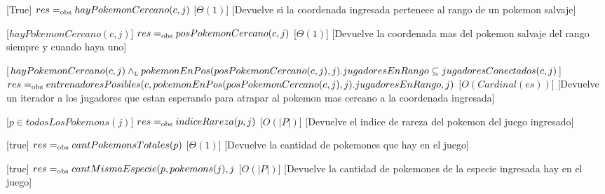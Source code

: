\begin{Interfaz}
  [True]
  {$res =_{\mathrm{obs}} hayPokemonCercano(c,j)$}
  [$\Theta(1)$] 
  [Devuelve si la coordenada ingresada pertenece al rango de un pokemon salvaje]   

  [$hayPokemonCercano(c,j)$]
  {$res =_{\mathrm{obs}} posPokemonCercano(c,j)$}
  [$\Theta(1)$] %
  [Devuelve la coordenada mas del pokemon salvaje del rango siempre y cuando haya uno]   

  [$hayPokemonCercano(c,j) \land_{\mathrm{\scriptscriptstyle{L}}} pokemonEnPos(posPokemonCercano(c,j),j).jugadoresEnRango \subseteq jugadoresConectados(c,j)$]
  {$res =_{\mathrm{obs}} entrenadoresPosibles(c,pokemonEnPos(posPokemonCercano(c,j),j).jugadoresEnRango,j)$}
  [$O(Cardinal(es))$] 
  [Devuelve un iterador a los jugadores que estan esperando para atrapar al pokemon mas cercano a la coordenada ingresada]   

  [$p \in todosLosPokemons(j)$]
  {$res =_{\mathrm{obs}} indiceRareza(p,j)$}
  [$O(|P|)$] 
  [Devuelve el indice de rareza del pokemon del juego ingresado]

  [true]
  {$res =_{\mathrm{obs}} cantPokemonsTotales(p)$}
  [$\Theta(1)$] 
  [Devuelve la cantidad de pokemones que hay en el juego]

  [true]
  {$res =_{\mathrm{obs}} cantMismaEspecie(p, pokemons(j), j$}
  [$O(|P|)$] 
  [Devuelve la cantidad de pokemones de la especie ingresada hay en el juego]

  
\end{Interfaz}

